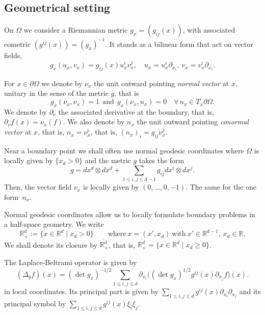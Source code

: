 \documentclass[10pt]{amsart}
\let\sep\mid
\theoremstyle{plain}
\theoremstyle{definition}
\def\R{\mathbb{R}}
\newcommand{\ovl}[1]{\overline{#1}}
\newcommand{\Rdp}{\R^d_+}
\begin{document}
\subsection{Geometrical setting}
\label{sec: Geometrical setting}

On $\Omega$ we consider a Riemannian metric $g_x = (g_{ij}(x))$, with
associated cometric $(g^{ij}(x)) = (g_x)^{-1}$.
It stands as a bilinear form that act on vector fields,
\[
g_x (u_x, v_x) = g_{ij}(x) u_x^i v_x^j,
\quad u_x = u_x^i \partial_{x_i}, \
v_x = v_x^i \partial_{x_i}.
\]

For $x \in \partial \Omega$ we denote by $\nu_x$ the unit outward
pointing \emph{normal vector} at $x$, unitary in the sense of the
metric $g$, that is
\begin{equation*}
g_x(\nu_x, \nu_x)=1
\ \ \text{and} \ \
g_x(\nu_x, u_x)=0 \quad \forall\,u_x \in T_x \partial \Omega.
\end{equation*}
We denote by $\partial_\nu$ the associated derivative at the boundary,
that is, $\partial_\nu f (x) = \nu_x (f)$.
We also denote by $n_x$ the unit outward
pointing \emph{conormal vector} at $x$, that is,
$n_x = \nu_x^\flat$, that is, $(n_x)_i = g_{i j} \nu_x^j$.

Near a boundary point we shall often use normal geodesic coordinates
where $\Omega$ is locally given by $\{ x_d >0\}$ and the
metric $g$ takes the form
\begin{equation*}
g=dx^d\otimes dx^d
+\sum_{1\leq i,j\leq d-1} g_{ij} dx^i\otimes dx^j.
\end{equation*}
Then, the vector field $\nu_x$ is locally given by $(0, \dots, 0,
-1)$. The same for the one form~$n_x$.

Normal geodesic coordinates allow us to locally formulate
boundary problems in a half-space geometry. We write
\[
\Rdp:=\{ x\in\R^d\sep x_d>0\}\qquad \text{where}\
x=(x',x_d) \ \text{with}\ x'\in\R^{d-1},\, x_d\in\R.
\]
We shall denote its closure by $\ovl{\Rdp}$, that is,
$\ovl{\Rdp} = \{ x\in \R^d\sep x_d\geq 0\}$.

The Laplace-Beltrami operator
is given by
\begin{equation}
\label{eq: laplace-Beltrami}
(\Delta_g f) (x) =(\det g_x)^{-1/2}
\sum_{1\leq i, j\leq d} \partial_{x_i}\big((\det g_x)^{1/2} g^{i j}(x)
\partial_{x_j} f \big)(x).
\end{equation}
in local coordinates. Its principal part is given by
$\sum_{1\leq i, j\leq d} g^{i j}(x) \partial_{x_i} \partial_{x_j}$ and
its principal symbol by $\sum_{1\leq i, j\leq d} g^{i j}(x) \xi_i
\xi_j$.
\end{document}
